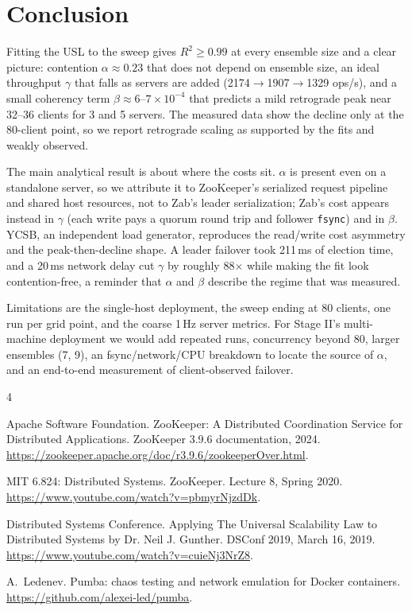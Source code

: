 \documentclass{llncs}
\begin{document}
\section{Conclusion}

Fitting the USL to the sweep gives $R^2\ge0.99$ at every ensemble size and a
clear picture: contention $\alpha\approx0.23$ that does not depend on
ensemble size, an ideal throughput $\gamma$ that falls as servers are added
(2174$\to$1907$\to$1329 ops/s), and a small coherency term
$\beta\approx6$--$7\times10^{-4}$ that predicts a mild retrograde peak near
32--36 clients for 3 and 5 servers. The measured data show the decline only
at the 80-client point, so we report retrograde scaling as supported by the
fits and weakly observed.

The main analytical result is about where the costs sit. $\alpha$ is
present even on a standalone server, so we attribute it to ZooKeeper's
serialized request pipeline and shared host resources, not to Zab's leader
serialization; Zab's cost appears instead in $\gamma$ (each write pays a
quorum round trip and follower \texttt{fsync}) and in $\beta$. YCSB, an
independent load generator, reproduces the read/write cost asymmetry and the
peak-then-decline shape. A leader failover took 211\,ms of election time, and
a 20\,ms network delay cut $\gamma$ by roughly 88$\times$ while making the
fit look contention-free, a reminder that $\alpha$ and $\beta$ describe the
regime that was measured.

Limitations are the single-host deployment, the sweep ending at 80 clients,
one run per grid point, and the coarse 1\,Hz server metrics. For Stage II's
multi-machine deployment we would add repeated runs, concurrency beyond 80,
larger ensembles (7, 9), an fsync/network/CPU breakdown to locate the source
of $\alpha$, and an end-to-end measurement of client-observed failover.

\begin{thebibliography}{4}

Apache Software Foundation.
\newblock ZooKeeper: A Distributed Coordination Service for Distributed
  Applications.
\newblock ZooKeeper 3.9.6 documentation, 2024.
\newblock \url{https://zookeeper.apache.org/doc/r3.9.6/zookeeperOver.html}.

MIT 6.824: Distributed Systems.
\newblock ZooKeeper.
\newblock Lecture 8, Spring 2020.
\newblock \url{https://www.youtube.com/watch?v=pbmyrNjzdDk}.

Distributed Systems Conference.
\newblock Applying The Universal Scalability Law to Distributed Systems by Dr. Neil J. Gunther.
\newblock DSConf 2019, March 16, 2019.
\newblock \url{https://www.youtube.com/watch?v=cuieNj3NrZ8}.

A.~Ledenev.
\newblock Pumba: chaos testing and network emulation for Docker containers.
\newblock \url{https://github.com/alexei-led/pumba}.

\end{thebibliography}
\end{document}

